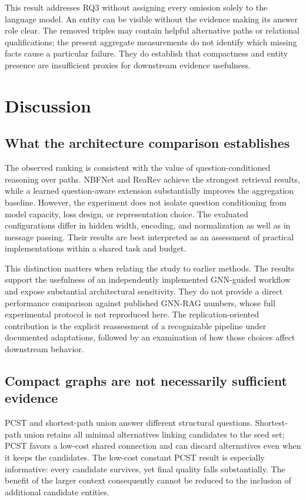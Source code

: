 \documentclass[10pt]{article}
\begin{document}
This result addresses RQ3 without assigning every omission solely to the language model. An entity can be visible without the evidence making its answer role clear. The removed triples may contain helpful alternative paths or relational qualifications; the present aggregate measurements do not identify which missing facts cause a particular failure. They do establish that compactness and entity presence are insufficient proxies for downstream evidence usefulness.

\section{Discussion}
\label{sec:discussion}

\subsection{What the architecture comparison establishes}

The observed ranking is consistent with the value of question-conditioned reasoning over paths. NBFNet and ReaRev achieve the strongest retrieval results, while a learned question-aware extension substantially improves the aggregation baseline. However, the experiment does not isolate question conditioning from model capacity, loss design, or representation choice. The evaluated configurations differ in hidden width, encoding, and normalization as well as in message passing. Their results are best interpreted as an assessment of practical implementations within a shared task and budget.

This distinction matters when relating the study to earlier methods. The results support the usefulness of an independently implemented GNN-guided workflow and expose substantial architectural sensitivity. They do not provide a direct performance comparison against published GNN-RAG numbers, whose full experimental protocol is not reproduced here. The replication-oriented contribution is the explicit reassessment of a recognizable pipeline under documented adaptations, followed by an examination of how those choices affect downstream behavior.

\subsection{Compact graphs are not necessarily sufficient evidence}

PCST and shortest-path union answer different structural questions. Shortest-path union retains all minimal alternatives linking candidates to the seed set; PCST favors a low-cost shared connection and can discard alternatives even when it keeps the candidates. The low-cost constant PCST result is especially informative: every candidate survives, yet final quality falls substantially. The benefit of the larger context consequently cannot be reduced to the inclusion of additional candidate entities.
\end{document}
